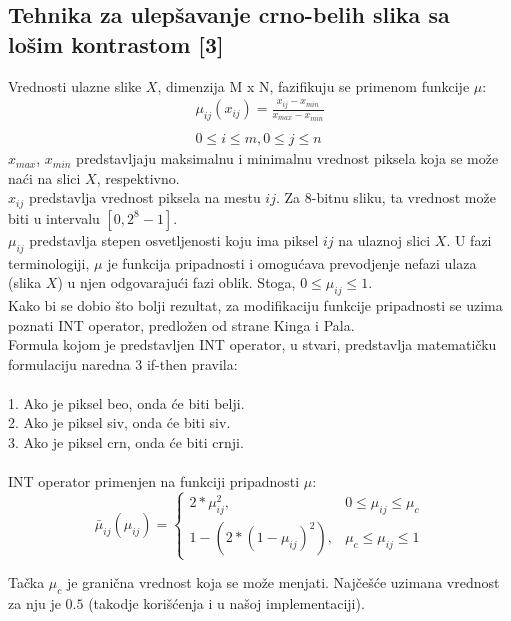 \documentclass[12pt,a4paper]{article}
\theoremstyle{definition}
\theoremstyle{remark}
\theoremstyle{plain}
\begin{document}
\newpage
\subsection{Tehnika za ulep\v savanje crno-belih slika sa lo\v sim kontrastom [3]}

Vrednosti ulazne slike $X$, dimenzija M x N, fazifikuju se primenom funkcije $\mu$:\\
\begin{align*}
  \mu_{ij}(x_{ij}) =  \frac{x_{ij} - x_{min}}{x_{max} - x_{min}}\\ \\
  0\leq i \leq m, 0\leq j \leq n
\end{align*}
$x_{max}$, $x_{min}$ predstavljaju maksimalnu i minimalnu vrednost piksela koja se mo\v ze na\' ci na slici $X$, respektivno.\\
$x_{ij}$ predstavlja vrednost piksela na mestu $ij$. Za 8-bitnu sliku, ta vrednost mo\v ze biti u intervalu $[0, 2^8 - 1]$. \\ 
$\mu_{ij}$ predstavlja stepen osvetljenosti koju ima piksel $ij$ na ulaznoj slici $X$. U fazi terminologiji, $\mu$ je funkcija pripadnosti i omogu\' cava 
prevodjenje nefazi ulaza (slika $X$) u njen odgovaraju\' ci fazi oblik.
Stoga, $0\leq \mu_{ij} \leq 1$.\\

Kako bi se dobio \v sto bolji rezultat, za modifikaciju funkcije pripadnosti se uzima poznati INT operator, predlo\v zen od strane Kinga i Pala.\\
Formula kojom je predstavljen INT operator, u stvari, predstavlja matemati\v cku formulaciju
naredna 3 if-then pravila: \\ \\
1. Ako je piksel beo, onda \'ce biti belji.\\
2. Ako je piksel siv, onda \'ce biti siv. \\
3. Ako je piksel crn, onda \'ce biti crnji.\\ \\
INT operator primenjen na funkciji pripadnosti $\mu$:
\[
    \bar\mu_{ij}(\mu_{ij}) = \left\{\begin{array}{lr}
        2 * \mu_{ij}^2, & 0\leq \mu_{ij}\leq \mu_{c}\\
        1 - (2 * (1 - \mu_{ij})^2), & \mu_{c}\leq \mu_{ij}\leq 1
        \end{array}
  \]

Ta\v cka $\mu_{c}$ je grani\v cna vrednost koja se mo\v ze menjati. Naj\v ce\v s\' ce uzimana vrednost za nju je $0.5$ 
(takodje kori\v s\' cenja i u na\v soj implementaciji). \\
\end{document}
